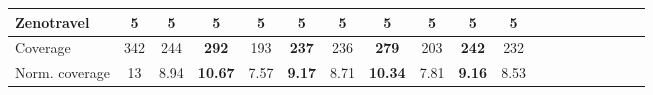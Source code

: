 \begin{tabular}{lccccccccccccccccccl}
Zenotravel & 5 & \textbf{5} & \textbf{5} & \textbf{5} & \textbf{5} & \textbf{5} & \textbf{5} & \textbf{5} & \textbf{5} &\multicolumn{2}{c}{ \textbf{5}  } \\ 
\midrule 
 Coverage & 342 & 244 & \textbf{292} & 193 & \textbf{237} & 236 & \textbf{279} & 203 & \textbf{242} &\multicolumn{2}{c}{ 232  } \\ 
Norm. coverage & 13 & 8.94 & \textbf{10.67} & 7.57 & \textbf{9.17} & 8.71 & \textbf{10.34} & 7.81 & \textbf{9.16} &\multicolumn{2}{c}{ 8.53  } \\ 
\bottomrule 
 \end{tabular} 

